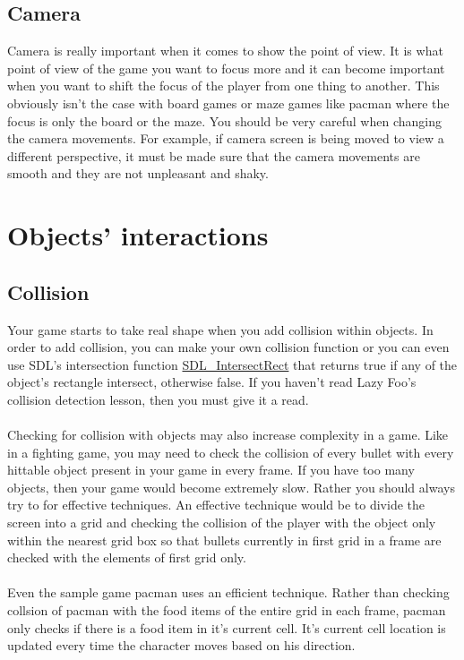 \documentclass[11pt,fleqn]{book} %
\begin{document}
    \section{Camera}
    Camera is really important when it comes to show the point of view. It is what point of view of the game you want to focus more and it can become important when you want to shift the focus of the player from one thing to another. This obviously isn't the case with board games or maze games like pacman where the focus is only the board or the maze. 
    You should be very careful when changing the camera movements. For example, if camera screen is being moved to view a different perspective, it must be made sure that the camera movements are smooth and they are not unpleasant and shaky. 
    

\chapter{Objects' interactions} %
    \section{Collision} %
    Your game starts to take real shape when you add collision within objects. In order to add collision, you can make your own collision function or you can even use SDL's intersection function \textcolor{blue}{\href{https://wiki.libsdl.org/SDL_IntersectRect}{SDL\_IntersectRect}} that returns  true if any of the object's rectangle intersect, otherwise false. If you haven't read Lazy Foo's collision detection lesson, then you must give it a read. \\ \\
   Checking for collision with objects may also increase complexity in a game. Like in a fighting game, you may need to check the collision of every bullet with every hittable object present in your game in every frame. If you have too many objects, then your game would become extremely slow. Rather you should always try to for effective techniques. An effective technique would be to divide the screen into a grid and checking the collision of the player with the object only within the nearest grid box so that bullets currently in first grid in a frame are checked with the elements of first grid only. \\ \\
   Even the sample game pacman uses an efficient technique. Rather than checking collsion of pacman with the food items of the entire grid in each frame, pacman only checks if there is a food item in it's current cell. It's current cell location is updated every time the character moves based on his direction.
\end{document}
